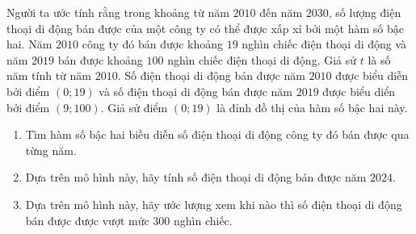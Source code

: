 \begin{bt}%
	Người ta ước tính rằng trong khoảng từ năm $2010$ đến năm $2030$, số lượng điện thoại di động bán được của một công ty có thể được xấp xỉ bởi một hàm số bậc hai. Năm $2010$ công ty đó bán được khoảng $19$ nghìn chiếc điện thoại di động và năm $2019$ bán được khoảng $100$ nghìn chiếc điện thoại di động. Giả sử $t$ là số năm tính từ näm $2010$. Số điện thoại di động bán được năm $2010$ được biểu diễn bởi điểm $(0 ; 19)$ và số điện thoại di động bán được năm $2019$ được biểu diển bởi điểm $(9 ; 100)$. Giả sử điểm $(0 ; 19)$ là đỉnh đồ thị của hàm số bậc hai này.
	\begin{enumerate}
		\item 
		Tìm hàm số bậc hai biều diễn số điện thoại di động công ty đó bán được qua từng năm.
		\item  Dựa trên mô hình này, hãy tính số điện thoại di động bán được năm $2024$.
		\item Dựa trên mô hình này, hãy ước lượng xem khi nào thì số điện thoại di động bán được được vượt mức $300$ nghìn chiếc.
	\end{enumerate}
\end{bt}

